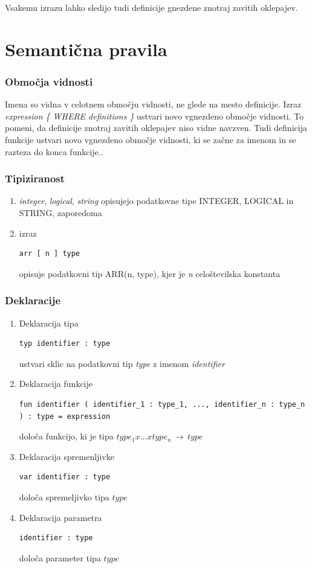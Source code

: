 \documentclass[a4paper, 12pt]{book}
\begin{document}
Vsakemu izrazu lahko sledijo tudi definicije gnezdene znotraj zavitih oklepajev.

\section{Semantična pravila}

\subsubsection{Območja vidnosti}

Imena so vidna v celotnem območju vidnosti, ne glede na mesto definicije. Izraz \textit{expression \{ WHERE definitions \}} ustvari novo vgnezdeno območje vidnosti. To pomeni, da definicije znotraj zavitih oklepajev niso vidne navzven. Tudi definicija funkcije ustvari novo vgnezdeno območje vidnosti, ki se začne za imenom in se razteza do konca funkcije..

\subsubsection{Tipiziranost}

\begin{enumerate}
	\item \textit{integer}, \textit{logical}, \textit{string} opisujejo podatkovne tipe INTEGER, LOGICAL in STRING, zaporedoma
	\item izraz 
\begin{lstlisting}[]
	arr [ n ] type
\end{lstlisting}
	opisuje podatkovni tip ARR(n, type), kjer je \textit{n} celoštevilska konstanta 
\end{enumerate}

\subsubsection{Deklaracije}

\begin{enumerate}
	\item Deklaracija tipa
\begin{lstlisting}[]
typ identifier : type
\end{lstlisting}
	ustvari sklic na podatkovni tip \textit{type} z imenom \textit{identifier}
	\item Deklaracija funkcije
\begin{lstlisting}[]
fun identifier ( identifier_1 : type_1, ..., identifier_n : type_n ) : type = expression 
\end{lstlisting}
	določa funkcijo, ki je tipa $type_1 x ... x type_n \,\to\, type $
	\item Deklaracija spremenljivke
\begin{lstlisting}[]
var identifier : type
\end{lstlisting}
določa spremeljivko tipa $type$
	\item Deklaracija parametra
\begin{lstlisting}[]
identifier : type
\end{lstlisting}
določa parameter tipa $type$
\end{enumerate}
\end{document}
